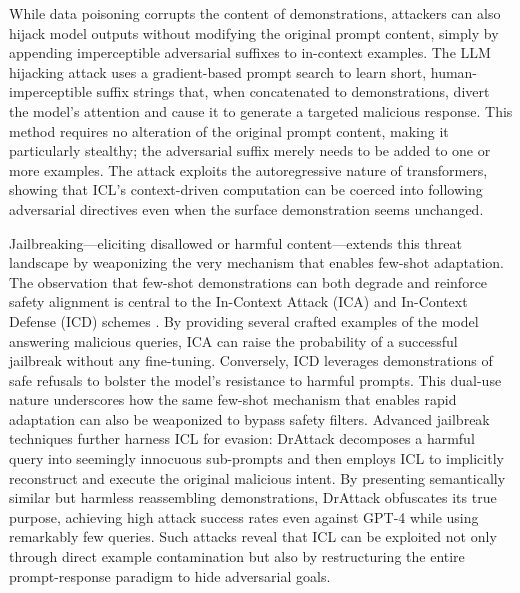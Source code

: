 \documentclass[11pt]{article}
\begin{document}
While data poisoning corrupts the content of demonstrations, attackers can also hijack model outputs without modifying the original prompt content, simply by appending imperceptible adversarial suffixes to in-context examples. The LLM hijacking attack \cite{ref174} uses a gradient-based prompt search to learn short, human-imperceptible suffix strings that, when concatenated to demonstrations, divert the model's attention and cause it to generate a targeted malicious response. This method requires no alteration of the original prompt content, making it particularly stealthy; the adversarial suffix merely needs to be added to one or more examples. The attack exploits the autoregressive nature of transformers, showing that ICL's context-driven computation can be coerced into following adversarial directives even when the surface demonstration seems unchanged.

Jailbreaking---eliciting disallowed or harmful content---extends this threat landscape by weaponizing the very mechanism that enables few-shot adaptation. The observation that few-shot demonstrations can both degrade and reinforce safety alignment is central to the In-Context Attack (ICA) and In-Context Defense (ICD) schemes \cite{ref175}. By providing several crafted examples of the model answering malicious queries, ICA can raise the probability of a successful jailbreak without any fine-tuning. Conversely, ICD leverages demonstrations of safe refusals to bolster the model's resistance to harmful prompts. This dual-use nature underscores how the same few-shot mechanism that enables rapid adaptation can also be weaponized to bypass safety filters. Advanced jailbreak techniques further harness ICL for evasion: DrAttack \cite{ref176} decomposes a harmful query into seemingly innocuous sub-prompts and then employs ICL to implicitly reconstruct and execute the original malicious intent. By presenting semantically similar but harmless reassembling demonstrations, DrAttack obfuscates its true purpose, achieving high attack success rates even against GPT-4 while using remarkably few queries. Such attacks reveal that ICL can be exploited not only through direct example contamination but also by restructuring the entire prompt-response paradigm to hide adversarial goals.
\end{document}
